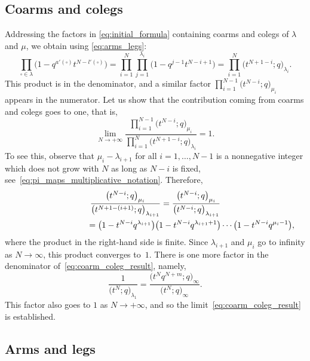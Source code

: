 \documentclass[11pt]{article}
\numberwithin{equation}{section}
\numberwithin{equation}{section}
\begin{document}
\subsection{Coarms and colegs}
Addressing the factors in
\eqref{eq:initial_formula}
containing coarms and colegs of $\lambda$ and $\mu$,
we obtain using \eqref{eq:arms_legs}:
\begin{equation*}
	\prod_{\square\in \lambda}\big(1-q^{a'(\square)}t^{N-l'(\square)}\big)
	=
	\prod_{i=1}^{N}
	\prod_{j=1}^{\lambda_i}
	\big(1-q^{j-1}t^{N-i+1}\big)
	=
	\prod_{i=1}^{N}
	\big(t^{N+1-i};q\big)_{\lambda_i}.
\end{equation*}
This product is in the denominator, and a similar
factor
$\prod_{i=1}^{N-1}
\big(t^{N-i};q\big)_{\mu_i}$
appears in the numerator.
Let us show that the contribution coming from
coarms and colegs goes to one, that is,%
\begin{equation}
	\label{eq:coarm_coleg_result}
	\lim_{N\to+\infty}
	\frac{\prod_{i=1}^{N-1}
	\big(t^{N-i};q\big)_{\mu_i}}
	{\prod_{i=1}^{N}
	\big(t^{N+1-i};q\big)_{\lambda_i}}=1.
\end{equation}
To see this, observe that
$\mu_{i}-\lambda_{i+1}$ for all $i=1,\dots,N-1 $ is a nonnegative integer
which does not grow with $N$ as long as $N-i$ is fixed,
see~\eqref{eq:pi_maps_multiplicative_notation}. Therefore,
\begin{gather*}
	\frac{\big(t^{N-i};q\big)_{\mu_i}}{\big(t^{N+1-(i+1)};q\big)_{\lambda_{i+1}}}=
	\frac{\big(t^{N-i};q\big)_{\mu_i}}{\big(t^{N-i};q\big)_{\lambda_{i+1}}}\\
\hphantom{\frac{\big(t^{N-i};q\big)_{\mu_i}}{\big(t^{N+1-(i+1)};q\big)_{\lambda_{i+1}}}}{}
=
	\big(1-t^{N-i}q^{\lambda_{i+1}}\big)\big(1-t^{N-i}q^{\lambda_{i+1}+1}\big)\cdots\big(1-t^{N-i}q^{\mu_i-1}\big) ,
\end{gather*}
where the product in the right-hand side is finite. Since $\lambda_{i+1}$ and $\mu_i$ go to infinity
as $N\to\infty$, this product converges to~$1$.
There is one more factor in the denominator of~\eqref{eq:coarm_coleg_result},
namely,
\begin{equation*}
	\frac{1}{\big(t^N;q\big)_{\lambda_1}}=
	\frac{\big(t^Nq^{N+m};q\big)_\infty}{\big(t^N;q\big)_\infty}.
\end{equation*}
This factor also goes to $1$ as $N\to+\infty$,
and so the limit~\eqref{eq:coarm_coleg_result} is established.

\subsection{Arms and legs}
\end{document}
